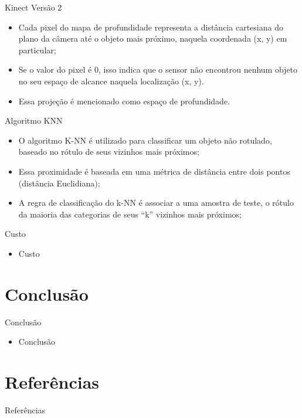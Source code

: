\documentclass[11pt]{beamer}
\begin{document}
\begin{frame}{Kinect Versão 2}

\begin{itemize}
	\item Cada pixel do mapa de profundidade representa a distância cartesiana do plano da câmera até o objeto mais próximo, naquela coordenada (x, y) em particular;
	\item Se o valor do pixel é 0, isso indica que o sensor não encontrou nenhum objeto no seu espaço de alcance naquela localização (x, y).
	\item Essa projeção é mencionado como espaço de profundidade.
\end{itemize}

\end{frame}

\begin{frame}{Algoritmo KNN}

\begin{itemize}
	\item O algoritmo K-NN é utilizado para classificar um objeto não rotulado, baseado no rótulo de seus vizinhos mais próximos;
	\item Essa proximidade é baseada em uma métrica de distância entre dois pontos (distância Euclidiana);
	\item A regra de classificação do k-NN é associar a uma amostra de teste, o rótulo da maioria das categorias de seus “k” vizinhos mais próximos;
\end{itemize}

\end{frame}

\begin{frame}{Custo}

\begin{itemize}
	\item Custo
\end{itemize}

\end{frame}

\section{Conclusão}
\begin{frame}{Conclusão}

\begin{itemize}
	\item Conclusão
\end{itemize}

\end{frame}

\section{Referências}
\begin{frame}{Referências}
  
	{}
	

\end{frame}
\end{document}
